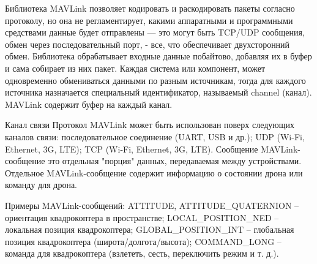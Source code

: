 
Библиотека MAV\-Link позволяет кодировать и раскодировать пакеты согласно протоколу, но она не регламентирует, какими аппаратными и программными средствами данные будет отправлены — это могут быть TCP/UDP сообщения, обмен через последовательный порт, - все, что обеспечивает двухсторонний обмен. Библиотека обрабатывает входные данные побайтово, добавляя их в буфер и сама собирает из них пакет. Каждая система или компонент, может одновременно обмениваться данными по разным источникам, тогда для каждого источника назначается специальный идентификатор, называемый channel (канал). MAV\-Link содержит буфер на каждый канал.


Канал связи
Протокол MAV\-Link может быть использован поверх следующих каналов связи:
последовательное соединение (UART, USB и др.);
UDP (Wi-Fi, Ethernet, 3G, LTE);
TCP (Wi-Fi, Ethernet, 3G, LTE).
Сообщение
MAV\-Link-сообщение это отдельная "порция" данных, передаваемая между устройствами. Отдельное MAV\-Link-сообщение содержит информацию о состоянии дрона или команду для дрона.

Примеры MAV\-Link-сообщений:
ATTITUDE, ATTITUDE\_QUATERNION – ориентация квадрокоптера в пространстве;
LOCAL\_POSITION\_NED – локальная позиция квадрокоптера;
GLOBAL\_POSITION\_INT – глобальная позиция квадрокоптера (широта/долгота/высота);
COMMAND\_LONG – команда для квадрокоптера (взлететь, сесть, переключить режим и т. д.).





